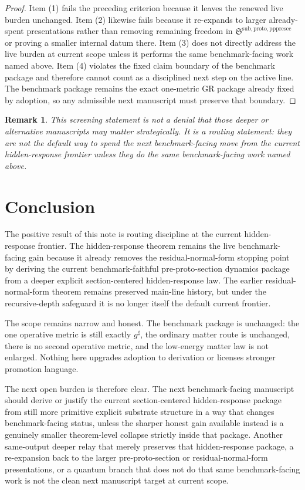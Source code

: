 \documentclass[11pt]{article}
\newcommand{\CompletedMetric}{g^{\sharp}}
\newcommand{\PrePreProtoSectionPackage}{\mathfrak S^{\mathrm{sub,proto,pppresec}}}
\newtheorem{remark}{Remark}
\begin{document}
\begin{proof}
Item (1) fails the preceding criterion because it leaves the renewed live burden unchanged. Item (2) likewise fails because it re-expands to larger already-spent presentations rather than removing remaining freedom in \(\PrePreProtoSectionPackage\) or proving a smaller internal datum there. Item (3) does not directly address the live burden at current scope unless it performs the same benchmark-facing work named above. Item (4) violates the fixed claim boundary of the benchmark package and therefore cannot count as a disciplined next step on the active line. The benchmark package remains the exact one-metric GR package already fixed by adoption, so any admissible next manuscript must preserve that boundary.
\end{proof}

\begin{remark}
This screening statement is not a denial that those deeper or alternative manuscripts may matter strategically. It is a routing statement: they are not the default way to spend the next benchmark-facing move from the current hidden-response frontier unless they do the same benchmark-facing work named above.
\end{remark}

\section{Conclusion}

The positive result of this note is routing discipline at the current hidden-response frontier. The hidden-response theorem remains the live benchmark-facing gain because it already removes the residual-normal-form stopping point by deriving the current benchmark-faithful pre-proto-section dynamics package from a deeper explicit section-centered hidden-response law. The earlier residual-normal-form theorem remains preserved main-line history, but under the recursive-depth safeguard it is no longer itself the default current frontier.

The scope remains narrow and honest. The benchmark package is unchanged: the one operative metric is still exactly \(\CompletedMetric\), the ordinary matter route is unchanged, there is no second operative metric, and the low-energy matter law is not enlarged. Nothing here upgrades adoption to derivation or licenses stronger promotion language.

The next open burden is therefore clear. The next benchmark-facing manuscript should derive or justify the current section-centered hidden-response package from still more primitive explicit substrate structure in a way that changes benchmark-facing status, unless the sharper honest gain available instead is a genuinely smaller theorem-level collapse strictly inside that package. Another same-output deeper relay that merely preserves that hidden-response package, a re-expansion back to the larger pre-proto-section or residual-normal-form presentations, or a quantum branch that does not do that same benchmark-facing work is not the clean next manuscript target at current scope.
\end{document}
